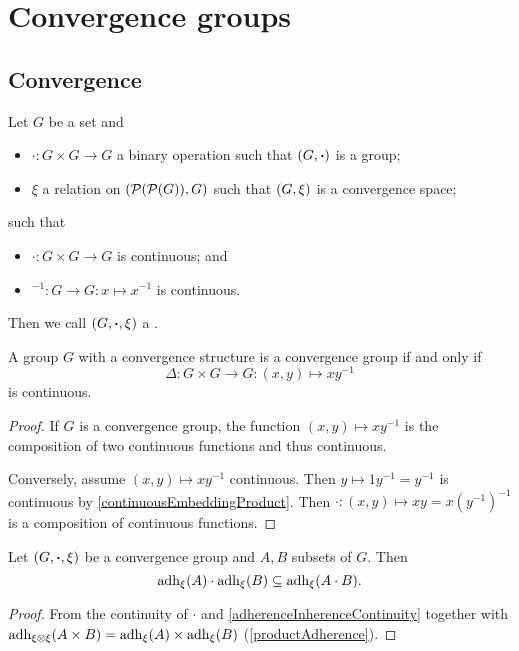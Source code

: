 \chapter{Convergence groups}
\section{Convergence}
\begin{definition}
Let $G$ be a set and
\begin{itemize}
\item $\boldsymbol{\cdot}: G\times G \to G$ a binary operation such that $\left( G, \boldsymbol{\cdot} \right)$ is a group;
\item $\xi$ a relation on $(\operatorname{\mathcal{P}}(\operatorname{\mathcal{P}}(G)), G)$ such that $\left( G, \xi \right)$ is a convergence space;
\end{itemize}
such that
\begin{itemize}
\item $\boldsymbol{\cdot}: G\times G \to G$ is continuous; and
\item $^{-1}: G\to G: x\mapsto x^{-1}$ is continuous.
\end{itemize}
Then we call $\left( G, \boldsymbol{\cdot}, \xi \right)$ a .
\end{definition}

\begin{lemma} \label{convergenceGroupCriterion}
A group $G$ with a convergence structure is a convergence group \textup{if and only if}
\[ \Delta: G\times G \to G: (x,y) \mapsto xy^{-1} \]
is continuous.
\end{lemma}
\begin{proof}
If $G$ is a convergence group, the function $(x,y) \mapsto xy^{-1}$ is the composition of two continuous functions and thus continuous.

Conversely, assume $(x,y) \mapsto xy^{-1}$ continuous. Then $y \mapsto 1y^{-1} = y^{-1}$ is continuous by \ref{continuousEmbeddingProduct}. Then $\boldsymbol{\cdot}: (x,y) \mapsto xy = x(y^{-1})^{-1}$ is a composition of continuous functions.
\end{proof}

\begin{lemma} \label{closureGroupOperation}
Let $\left( G, \boldsymbol{\cdot}, \xi \right)$ be a convergence group and $A,B$ subsets of $G$. Then
\[ \operatorname{adh}_\xi(A)\cdot \operatorname{adh}_\xi(B) \subseteq \operatorname{adh}_\xi(A\cdot B). \]
\end{lemma}
\begin{proof}
From the continuity of $\cdot$ and \ref{adherenceInherenceContinuity} together with $\operatorname{adh}_{\xi\otimes\xi}(A\times B) = \operatorname{adh}_\xi(A)\times \operatorname{adh}_\xi(B)$ (\ref{productAdherence}).
\end{proof}

